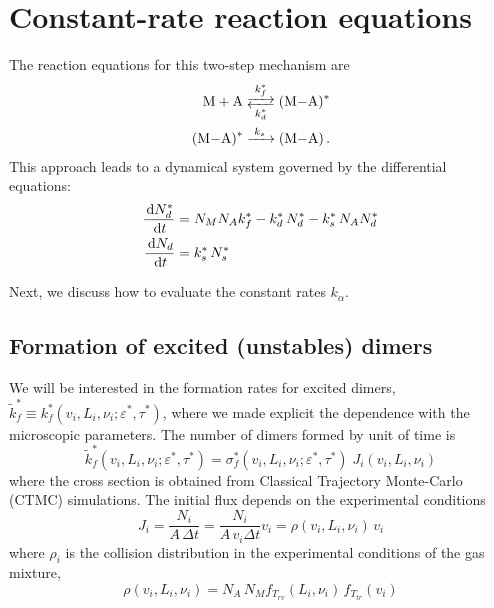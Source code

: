 \section{Constant-rate reaction equations}
\label{S:const-rate-reaction}

The reaction equations for this two-step mechanism are
\begin{subequations}
\begin{align}
  \label{Q:rates-master-equation-a}
  \ce{M + A <-->[{k_{f}^{*}}][{k_{d}^{*}}] (M-A)^{*}} \\
  \label{Q:rates-master-equation-b}
  \ce{ (M-A)^{*} ->[{k_{s}}] (M-A)} \,.
\end{align}
\end{subequations}
%
This approach leads to a dynamical system governed by the differential equations:
\begin{subequations}
\begin{align}
  \label{Q:rates-diff-equation-a}
  \frac{\,\mathrm{d} N^{*}_{d}}{\,\mathrm{d} t} &= N_{M} N_{A} k_{f}^{*} - k_{d}^{*}\, N^{*}_{d} - k_{s}^{*}\, N_{A} N^{*}_{d} \\
  \label{Q:rates-diff-equation-b}
  \frac{\,\mathrm{d} N_{d}}{\,\mathrm{d} t} &=  k_{s}^{*}\, N^{*}_{s} 
\end{align}
\end{subequations}

Next, we discuss how to evaluate the constant rates $k_{\alpha}$.

\subsection{Formation of excited (unstables) dimers}
\label{S:excit-unst-dimers}

We will be interested in the formation rates for excited dimers, $\tilde{k}_{f}^{*} \equiv k_{f}^{*}(v_{i}, L_{i}, \nu_{i} ; \varepsilon^{*}, \tau^{*})$, where we made explicit the dependence with the microscopic parameters. The number of dimers formed by unit of time is
\begin{equation}
  \label{Q:def-dimer-rate}
  \tilde{k}_{f}^{*}(v_{i}, L_{i}, \nu_{i} ; \varepsilon^{*}, \tau^{*}) = \sigma_{f}^{*}(v_{i}, L_{i}, \nu_{i} ; \varepsilon^{*}, \tau^{*}) \; J_{i}(v_{i}, L_{i}, \nu_{i} )
\end{equation}
where the cross section is obtained from Classical Trajectory Monte-Carlo (CTMC) simulations. The initial flux depends on the experimental conditions
\begin{equation}
  \label{Q:rates-flux}
  J_{i} =\frac{N_{i}}{A \,\Delta t} = \frac{N_{i}}{A \, v_{i} \Delta t} v_{i} = \rho(v_{i}, L_{i}, \nu_{i})\, v_{i}
\end{equation}
%
where $\rho_{i}$ is the collision distribution in the experimental conditions of the gas mixture,
\begin{equation}
  \label{Q:rates-def-collis-distrib}
  \rho(v_{i}, L_{i}, \nu_{i}) = N_{A} \, N_{M} f_{T_{rv}}(L_{i},\nu_{i}) \, f_{T_{tr}}(v_{i})
\end{equation}


